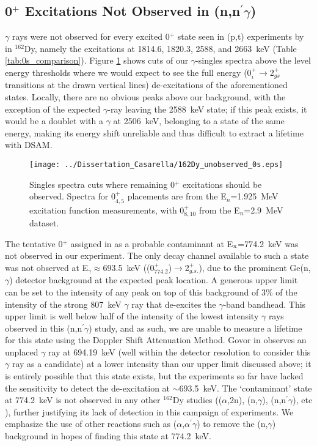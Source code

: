 \subsection{0$^+$ Excitations Not Observed in (n,n$^\prime\gamma$)}
$\gamma$ rays were not observed for every excited 0$^+$ state seen in (p,t) experiments by \cite{Meyer_pt0_2006} in $^{162}$Dy, namely the excitations at 1814.6, 1820.3, 2588, and 2663~keV (Table \ref{tab:0s_comparison}). Figure \ref{fig:162Dy_unobserved_0s} shows cuts of our $\gamma$-singles spectra above the level energy thresholds where we would expect to see the full energy (0$^+_i\rightarrow$2$^+_{gs}$ transitions at the drawn vertical lines) de-excitations of the aforementioned states. Locally, there are no obvious peaks above our background, with the exception of the expected $\gamma$-ray leaving the 2588~keV state; if this peak exists, it would be a doublet with a $\gamma$ at 2506~keV, belonging to a state of the same energy, making its energy shift unreliable and thus difficult to extract a lifetime with DSAM. 

\begin{figure}[t]
\begin{center}
\texttt{[image: ../Dissertation\_Casarella/162Dy\_unobserved\_0s.eps]}
\caption{Singles spectra cuts where remaining 0$^+$ excitations should be observed. Spectra for 0$^+_{4,5}$ placements are from the E$_n$=1.925~MeV excitation function measurements, with 0$^+_{8,10}$ from the E$_n$=2.9~MeV dataset.  \label{fig:162Dy_unobserved_0s}}
\end{center}
\end{figure}

The tentative 0$^+$ assigned in \cite{Meyer_pt0_2006} as a probable contaminant at E$_{\rm x}$=774.2~keV was not observed in our experiment. The only decay channel available to such a state was not observed at E$_\gamma\approx$693.5~keV ((0$^+_{774.2}$)$\rightarrow$2$^+_{g.s.}$), due to the prominent Ge(n,$\gamma$) detector background at the expected peak location. A generous upper limit can be set to the intensity of any peak on top of this background of 3\% of the intensity of the strong 807~keV $\gamma$ ray that de-excites the $\gamma$-band bandhead. This upper limit is well below half of the intensity of the lowest intensity $\gamma$ rays observed in this (n,n$^\prime\gamma$) study, and as such, we are unable to measure a lifetime for this state using the Doppler Shift Attenuation Method. Govor in \cite{Govor_162Dy2002} observes an unplaced $\gamma$ ray at 694.19~keV (well within the detector resolution to consider this $\gamma$ ray as a candidate) at a lower intensity than our upper limit discussed above; it is entirely possible that this state exists, but the experiments so far have lacked the sensitivity to detect the de-excitation at $\sim$693.5~keV. The `contaminant' state at 774.2~keV is not observed in any other $^{162}$Dy studies (($\alpha$,2n), (n,$\gamma$), (n,n$^\prime\gamma$), etc \cite{Aprahamian200642}), further justifying its lack of detection in this campaign of experiments. We emphasize the use of other reactions such as ($\alpha$,$\alpha^\prime\gamma$) to remove the (n,$\gamma$) background in hopes of finding this state at 774.2~keV.

